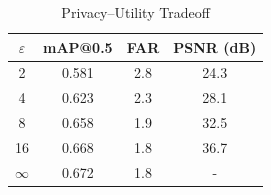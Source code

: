 \begin{table}[t]
\centering
\caption{Privacy--Utility Tradeoff}
\label{tab:privacy}
\begin{tabular}{cccc}
\toprule
$\varepsilon$ & mAP@0.5 & FAR & PSNR (dB) \\
\midrule
2 & 0.581 & 2.8 & 24.3 \\
4 & 0.623 & 2.3 & 28.1 \\
8 & 0.658 & 1.9 & 32.5 \\
16 & 0.668 & 1.8 & 36.7 \\
$\infty$ & 0.672 & 1.8 & - \\
\bottomrule
\end{tabular}
\end{table}